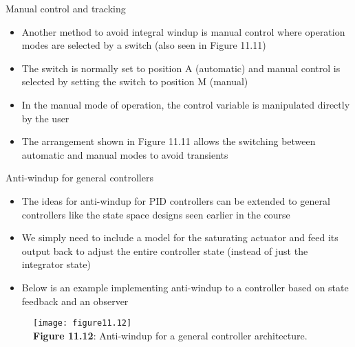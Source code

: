 \documentclass{beamer-control}
\begin{document}
\begin{frame}{Manual control and tracking}
	\begin{itemize}
		\item Another method to avoid integral windup is manual control where operation modes are selected by a switch (also seen in Figure 11.11)
		\item The switch is normally set to position A (automatic) and manual control is selected by setting the switch to position M (manual)
		\item In the manual mode of operation, the control variable is manipulated directly by the user
		\item The arrangement shown in Figure 11.11 allows the switching between automatic and manual modes to avoid transients 
	\end{itemize}
\end{frame}


\begin{frame}{Anti-windup for general controllers}
	\begin{itemize}
		\item The ideas for anti-windup for PID controllers can be extended to general controllers like the state space designs seen earlier in the course
		\item We simply need to include a model for the saturating actuator and feed its output back to adjust the entire controller state (instead of just the integrator state)
		\item Below is an example implementing anti-windup to a controller based on state feedback and an observer
\end{itemize}
\begin{figure}
	\centering
	\texttt{[image: figure11.12]}
	\\
	\textbf{Figure 11.12}: Anti-windup for a general controller architecture.
\end{figure}

\end{frame}


\SUMMARYFRAME
\FINALE
\end{document}
